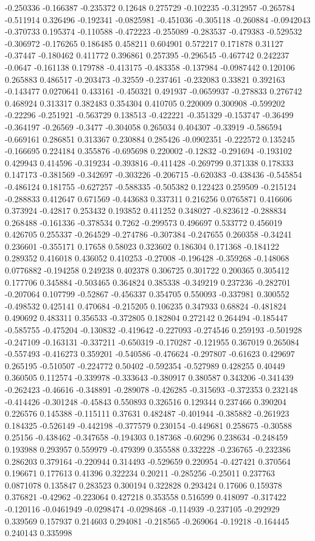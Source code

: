 -0.250336 -0.166387 -0.235372 0.12648 0.275729 -0.102235 -0.312957 -0.265784 -0.511914 0.326496 -0.192341 -0.0825981 -0.451036 -0.305118 -0.260884 -0.0942043 -0.370733 0.195374 -0.110588 -0.472223 -0.255089 -0.283537 -0.479383 -0.529532 -0.306972 -0.176265 0.186485 0.458211 0.604901 0.572217 0.171878 0.31127 -0.37447 -0.180462 0.411772 0.396861 0.257395 -0.296545 -0.467742 0.242237 -0.0647 -0.161138 0.179788 -0.413175 -0.483358 -0.137984 -0.0987442 0.120106 0.265883 0.486517 -0.203473 -0.32559 -0.237461 -0.232083 0.33821 0.392163 -0.143477 0.0270641 0.433161 -0.450321 0.491937 -0.0659937 -0.278833 0.276742 0.468924 0.313317 0.382483 0.354304 0.410705 0.220009 0.300908 -0.599202 -0.22296 -0.251921 -0.563729 0.138513 -0.422221 -0.351329 -0.153747 -0.36499 -0.364197 -0.26569 -0.3477 -0.304058 0.265034 0.404307 -0.33919 -0.586594 -0.669161 0.286851 0.313367 0.230884 0.285426 -0.0902351 -0.222572 0.135245 -0.166695 0.224184 0.355876 -0.695698 0.220002 -0.12832 -0.291694 -0.193102 0.429943 0.414596 -0.319234 -0.393816 -0.411428 -0.269799 0.371338 0.178333 0.147173 -0.381569 -0.342697 -0.303226 -0.206715 -0.620383 -0.438436 -0.545854 -0.486124 0.181755 -0.627257 -0.588335 -0.505382 0.122423 0.259509 -0.215124 -0.288833 0.412647 0.671569 -0.443683 0.337311 0.216256 0.0765871 0.416606 0.373924 -0.42817 0.253432 0.193852 0.411252 0.348027 -0.823612 -0.288834 0.268488 -0.161336 -0.378534 0.7262 -0.299573 0.496697 0.533772 0.456019 0.426705 0.255337 -0.264529 -0.274786 -0.307384 -0.247655 0.260358 -0.34241 0.236601 -0.355171 0.17658 0.58023 0.323602 0.186304 0.171368 -0.184122 0.289352 0.416018 0.436052 0.410253 -0.27008 -0.196428 -0.359268 -0.148068 0.0776882 -0.194258 0.249238 0.402378 0.306725 0.301722 0.200365 0.305412 0.177706 0.345884 -0.503465 0.364824 0.385338 -0.349219 0.237236 -0.282701 -0.207064 0.107799 -0.52867 -0.456337 0.354705 0.550093 -0.337981 0.300552 -0.498532 0.425141 0.470684 -0.215205 0.106235 0.347933 0.68824 -0.481824 0.490692 0.483311 0.356533 -0.372805 0.182804 0.272142 0.264494 -0.185447 -0.585755 -0.475204 -0.130832 -0.419642 -0.227093 -0.274546 0.259193 -0.501928 -0.247109 -0.163131 -0.337211 -0.650319 -0.170287 -0.121955 0.367019 0.265084 -0.557493 -0.416273 0.359201 -0.540586 -0.476624 -0.297807 -0.61623 0.429697 0.265195 -0.510507 -0.224772 0.50402 -0.592354 -0.527989 0.428255 0.40449 0.360505 0.112574 -0.339978 -0.333643 -0.380917 0.380587 0.343206 -0.341439 -0.262423 -0.46616 -0.348891 -0.289078 -0.426285 -0.315693 -0.372353 0.232148 -0.414426 -0.301248 -0.45843 0.550893 0.326516 0.129344 0.237466 0.390204 0.226576 0.145388 -0.115111 0.37631 0.482487 -0.401944 -0.385882 -0.261923 0.184325 -0.526149 -0.442198 -0.377579 0.230154 -0.449681 0.258675 -0.30588 0.25156 -0.438462 -0.347658 -0.194303 0.187368 -0.60296 0.238634 -0.248459 0.193988 0.293957 0.559979 -0.479399 0.355588 0.332228 -0.236765 -0.232386 0.286203 0.379164 -0.220944 0.314493 -0.529659 0.220954 -0.427421 0.370564 0.196671 0.177613 0.41396 0.322234 0.20211 -0.285256 -0.25011 0.237763 0.0871078 0.135847 0.283523 0.300194 0.322828 0.293424 0.17606 0.159378 0.376821 -0.42962 -0.223064 0.427218 0.353558 0.516599 0.418097 -0.317422 -0.120116 -0.0461949 -0.0298474 -0.0298468 -0.114939 -0.237105 -0.292929 0.339569 0.157937 0.214603 0.294081 -0.218565 -0.269064 -0.19218 -0.164445 0.240143 0.335998 